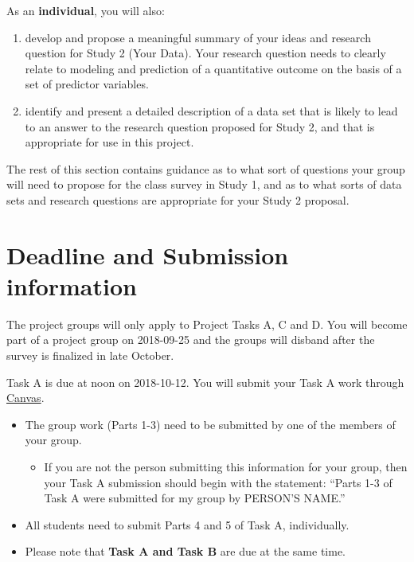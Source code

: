 \documentclass[]{book}
\providecommand{\tightlist}{%
  \setlength{\itemsep}{0pt}\setlength{\parskip}{0pt}}
\theoremstyle{definition}
\theoremstyle{definition}
\theoremstyle{definition}
\theoremstyle{remark}
\begin{document}
As an \textbf{individual}, you will also:

\begin{enumerate}
\def\labelenumi{\arabic{enumi}.}
\setcounter{enumi}{3}
\tightlist
\item
  develop and propose a meaningful summary of your ideas and research
  question for Study 2 (Your Data). Your research question needs to
  clearly relate to modeling and prediction of a quantitative outcome on
  the basis of a set of predictor variables.
\item
  identify and present a detailed description of a data set that is
  likely to lead to an answer to the research question proposed for
  Study 2, and that is appropriate for use in this project.
\end{enumerate}

The rest of this section contains guidance as to what sort of questions
your group will need to propose for the class survey in Study 1, and as
to what sorts of data sets and research questions are appropriate for
your Study 2 proposal.

\hypertarget{deadline-and-submission-information}{%
\section{Deadline and Submission
information}\label{deadline-and-submission-information}}

The project groups will only apply to Project Tasks A, C and D. You will
become part of a project group on 2018-09-25 and the groups will disband
after the survey is finalized in late October.

Task A is due at noon on 2018-10-12. You will submit your Task A work
through \href{https://canvas.case.edu/}{Canvas}.

\begin{itemize}
\tightlist
\item
  The group work (Parts 1-3) need to be submitted by one of the members
  of your group.

  \begin{itemize}
  \tightlist
  \item
    If you are not the person submitting this information for your
    group, then your Task A submission should begin with the statement:
    ``Parts 1-3 of Task A were submitted for my group by PERSON'S
    NAME.''
  \end{itemize}
\item
  All students need to submit Parts 4 and 5 of Task A, individually.
\item
  Please note that \textbf{Task A and Task B} are due at the same time.
\end{itemize}
\end{document}
